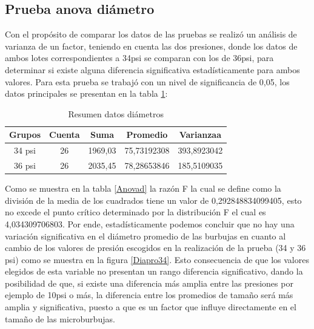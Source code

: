 \documentclass[12pt,twocolumn,a4paper]{article}
\begin{document}
\subsection{Prueba anova diámetro}

Con el propósito de comparar los datos de las pruebas se realizó un análisis de varianza de un factor, teniendo en cuenta las dos presiones, donde los datos de ambos lotes correspondientes a 34psi se comparan con los de 36psi, para determinar si existe alguna diferencia significativa estadísticamente para ambos valores. Para esta prueba se trabajó con un nivel de significancia de 0,05, los datos principales se presentan en la tabla \ref{Anovad1}:
	
\begin{table}
\centering
\begin{tabular}{| c | c | c | c | c |}

	\toprule
	 	\textbf{Grupos} & \textbf{Cuenta} & \textbf{Suma} & \textbf{Promedio} & \textbf{Varianzaa}\\
	 	\midrule
    	34 psi & 26 & 1969,03 & 75,73192308 & 393,8923042\\
    	36 psi & 26 & 2035,45 & 78,28653846	& 185,5109035\\ 	
    \bottomrule
    \end{tabular}
	\caption{Resumen datos diámetros}
	\label{Anovad1}
\end{table}


Como se muestra en la tabla \ref{Anovad} la razón F la cual se define como la división de la media de los cuadrados tiene un valor de 0,292848834099405, esto no excede el punto crítico determinado por la distribución F el cual es 4,034309706803. Por ende, estadísticamente podemos concluir que no hay una variación significativa en el diámetro promedio de las burbujas en cuanto al cambio de los valores de presión escogidos en la realización de la prueba (34 y 36 psi) como se muestra en la figura \ref{Diapro34}. Esto consecuencia de que los valores elegidos de esta variable no presentan un rango diferencia significativo, dando la posibilidad de que, si existe una diferencia más amplia entre las presiones por ejemplo de 10psi o más, la diferencia entre los promedios de tamaño será más amplia y significativa, puesto a que es un factor que influye directamente en el tamaño de las microburbujas.
\end{document}

